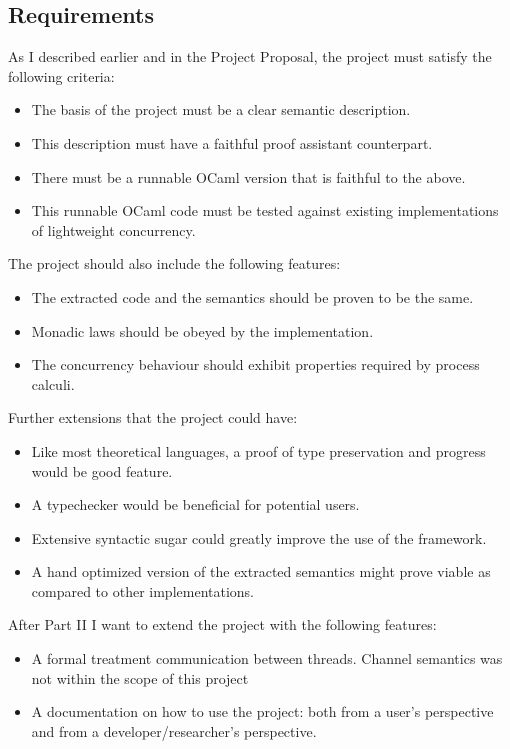 \documentclass[12pt,twoside,notitlepage]{report}
\begin{document}
\subsection{Requirements}
As I described earlier and in the Project Proposal, the project must satisfy the following criteria:
\begin{itemize}
\item{The basis of the project must be a clear semantic description.}
\item{This description must have a faithful proof assistant counterpart.}
\item{There must be a runnable OCaml version that is faithful to the above.}
\item{This runnable OCaml code must be tested against existing implementations of lightweight concurrency.}
\end{itemize}
The project should also include the following features:
\begin{itemize}
\item{The extracted code and the semantics should be proven to be the same.}
\item{Monadic laws should be obeyed by the implementation.}
\item{The concurrency behaviour should exhibit properties required by process calculi.}
\end{itemize}
Further extensions that the project could have:
\begin{itemize}
\item{Like most theoretical languages, a proof of type preservation and progress would be good feature.}
\item{A typechecker would be beneficial for potential users.}
\item{Extensive syntactic sugar could greatly improve the use of the framework.}
\item{A hand optimized version of the extracted semantics might prove viable as compared to other implementations.}
\end{itemize}
After Part II I want to extend the project with the following features:
\begin{itemize}
\item{A formal treatment communication between threads. Channel semantics was not within the scope of this project}
\item{A documentation on how to use the project: both from a user's perspective and from a developer/researcher's perspective.}
\end{itemize}
\end{document}
